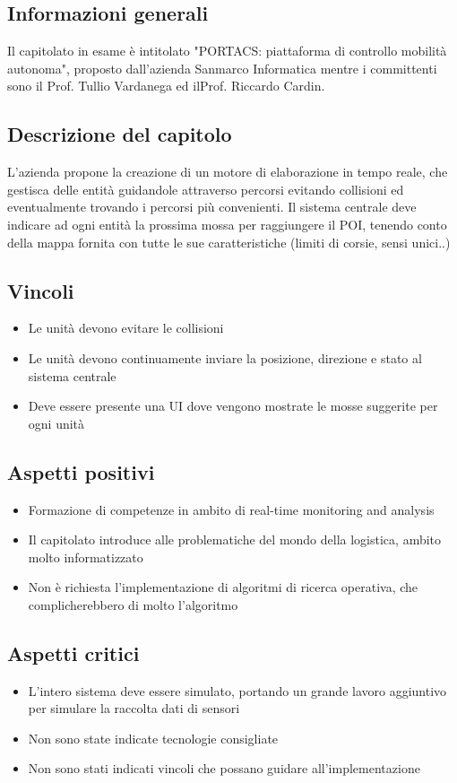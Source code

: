 \subsection{Informazioni generali}
Il capitolato in esame è intitolato "PORTACS: piattaforma di controllo mobilità autonoma", proposto dall'azienda Sanmarco Informatica mentre i committenti sono il Prof. Tullio Vardanega ed ilProf. Riccardo Cardin.
\subsection{Descrizione del capitolo}
L'azienda propone la creazione di un motore di elaborazione in tempo reale, che gestisca delle entità guidandole attraverso percorsi evitando collisioni ed eventualmente trovando i percorsi più convenienti.
Il sistema centrale deve indicare ad ogni entità la prossima mossa per raggiungere il POI, tenendo conto della mappa fornita con tutte le sue caratteristiche (limiti di corsie, sensi unici..)
\subsection{Vincoli}
\begin{itemize}
    \item Le unità devono evitare le collisioni
    \item Le unità devono continuamente inviare la posizione, direzione e stato al sistema centrale
    \item Deve essere presente una UI dove vengono mostrate le mosse suggerite per ogni unità
\end{itemize}
\subsection{Aspetti positivi}
\begin{itemize}
    \item Formazione di competenze in ambito di real-time monitoring and analysis
    \item Il capitolato introduce alle problematiche del mondo della logistica, ambito molto informatizzato
    \item Non è richiesta l'implementazione di algoritmi di ricerca operativa, che complicherebbero di molto l'algoritmo
\end{itemize}
\subsection{Aspetti critici}
\begin{itemize}
    \item L'intero sistema deve essere simulato, portando un grande lavoro aggiuntivo per simulare la raccolta dati di sensori
    \item Non sono state indicate tecnologie consigliate
    \item Non sono stati indicati vincoli che possano guidare all'implementazione
\end{itemize}
